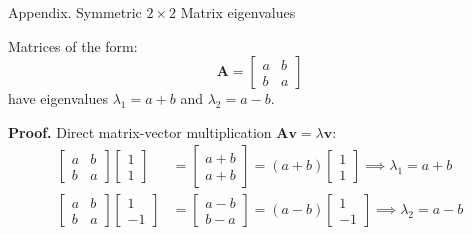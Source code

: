 \documentclass{beamer}
\begin{document}
\begin{frame}{Appendix. Symmetric $2 \times 2$ Matrix eigenvalues}
	\begin{flushleft}
		Matrices of the form:
		\[
		\mathbf A = \begin{bmatrix} a & b \\ b & a \end{bmatrix}
		\]
		have eigenvalues $\lambda_1 = a+b$ and $\lambda_2 = a-b$.
		
		\bigskip
		
		\textbf{Proof.} Direct matrix-vector multiplication $\mathbf A\mathbf{v} = \lambda \mathbf{v}$:
		\[
		\begin{aligned}
			\begin{bmatrix} a & b \\ b & a \end{bmatrix} \begin{bmatrix} 1 \\ 1 \end{bmatrix} &= \begin{bmatrix} a+b \\ a+b \end{bmatrix} = (a+b) \begin{bmatrix} 1 \\ 1 \end{bmatrix} \implies \lambda_1 = a+b\\[8pt]
			\begin{bmatrix} a & b \\ b & a \end{bmatrix} \begin{bmatrix} 1 \\ -1 \end{bmatrix} &= \begin{bmatrix} a-b \\ b-a \end{bmatrix} = (a-b) \begin{bmatrix} 1 \\ -1 \end{bmatrix} \implies \lambda_2 = a-b
		\end{aligned}
		\]
		
	\end{flushleft}
\end{frame}
\end{document}
